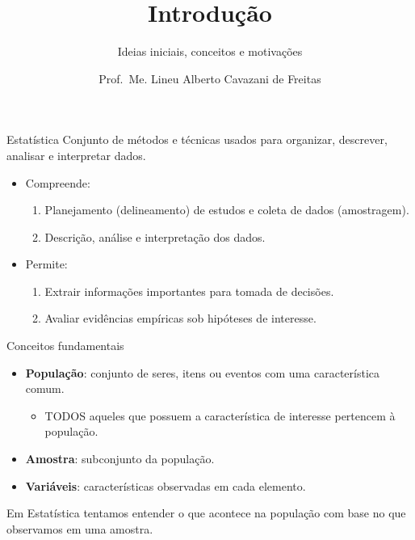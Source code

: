 \documentclass[
  ignorenonframetext,
  serif,
  professionalfont,
  usenames,
  dvipsnames,
  aspectratio = 169]{beamer}
\title{\textbf{Introdução}}
\subtitle{Ideias iniciais, conceitos e motivações}
\author{Prof.~Me. Lineu Alberto Cavazani de Freitas}
\date{}
\institute{\textbf{CE003 – Estatística II}\\
\strut \\
Departamento de Estatística\\
Laboratório de Estatística e Geoinformação}
\providecommand{\tightlist}{%
  \setlength{\itemsep}{0pt}\setlength{\parskip}{0pt}}
\renewcommand{\tightlist}{%
  \setlength{\itemsep}{0\baselineskip}
  \setlength{\parskip}{0.25\baselineskip}
}
\def\beginAHalfColumn{\begin{minipage}{0.49\textwidth}}%
\def\endColumns{\end{minipage}}%
\begin{document}
\frame{\titlepage}

\begin{frame}{}
\protect\hypertarget{section}{}
\begin{block}{Estatística}
\protect\hypertarget{estatuxedstica}{}
Conjunto de métodos e técnicas usados para organizar, descrever,
analisar e interpretar dados.
\end{block}

\beginAHalfColumn

\begin{itemize}
\tightlist
\item
  Compreende:

  \begin{enumerate}
  \tightlist
  \item
    Planejamento (delineamento) de estudos e coleta de dados
    (amostragem).
  \item
    Descrição, análise e interpretação dos dados.
  \end{enumerate}
\end{itemize}

\endColumns
\beginAHalfColumn

\begin{itemize}
\tightlist
\item
  Permite:

  \begin{enumerate}
  \tightlist
  \item
    Extrair informações importantes para tomada de decisões.
  \item
    Avaliar evidências empíricas sob hipóteses de interesse.
  \end{enumerate}
\end{itemize}

\endColumns
\end{frame}

\begin{frame}{Conceitos fundamentais}
\protect\hypertarget{conceitos-fundamentais}{}
\begin{itemize}
\tightlist
\item
  \textbf{População}: conjunto de seres, itens ou eventos com uma
  característica comum.

  \begin{itemize}
  \tightlist
  \item
    TODOS aqueles que possuem a característica de interesse pertencem à
    população.
  \end{itemize}
\item
  \textbf{Amostra}: subconjunto da população.
\item
  \textbf{Variáveis}: características observadas em cada elemento.
\end{itemize}

Em Estatística tentamos entender o que acontece na população com base no
que observamos em uma amostra.
\end{frame}
\end{document}
